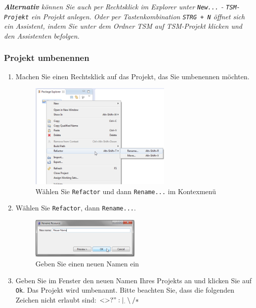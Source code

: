 \documentclass[11pt,a4paper,titlepage]{article}
\begin{document}
\textit{\textbf{Alternativ} können Sie auch per Rechtsklick im Explorer unter \texttt{New...} - \texttt{TSM-Projekt} ein Projekt anlegen.
Oder per Tastenkombination \texttt{STRG + N} öffnet sich ein Assistent, indem Sie unter dem Ordner TSM auf TSM-Projekt klicken und den Assistenten befolgen.}

\subsubsection{Projekt umbenennen}
\begin{enumerate}
\item Machen Sie einen Rechtsklick auf das Projekt, das Sie umbenennen möchten.


\begin{figure}[H]
\centering
\includegraphics[width= 260px]{BilderHandbuch/UmbenennenR.png}
\caption{Wählen Sie \texttt{Refactor} und dann \texttt{Rename...} im Kontexmenü}
\label{fig:UmbennenR1}
\end{figure}

\item Wählen Sie \texttt{Refactor}, dann \texttt{Rename...}.

\begin{figure}[H]
\centering
\includegraphics[width= 200px]{BilderHandbuch/UmbenennenFenster.png}
\caption{Geben Sie einen neuen Namen ein}
\label{fig:UmbenennenFenster2}
\end{figure}

\item Geben Sie im Fenster den neuen Namen Ihres Projekts an und klicken Sie auf \texttt{Ok}. Das Projekt wird umbenannt. Bitte beachten Sie, dass die folgenden Zeichen nicht erlaubt sind: $ < > ? " : | _ . \setminus / *$
\end{enumerate}
\end{document}

